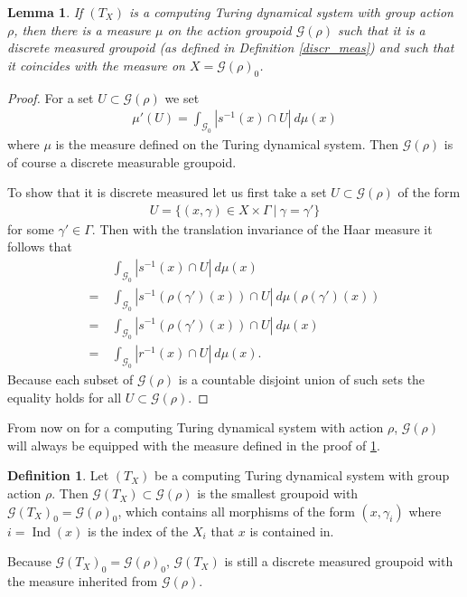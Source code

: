 \documentclass[12pt,a4paper]{scrartcl}
\theoremstyle{plain}
\newtheorem{Lemma}[Theorem]{Lemma}
\theoremstyle{definition}
\newtheorem{Definition}[Theorem]{Definition}
\newcommand{\2}{\mathbb{Z} / 2 \mathbb{Z}}
\newcommand{\G}{\mathcal{G}}
\newcommand{\1}{\bar{1}}
\newcommand{\0}{\bar{0}}
\newcommand{\Ind}{\operatorname{Ind}}
\begin{document}
\begin{Lemma}\label{act_group_discrete_meas}
	If $(T_X)$ is a computing Turing dynamical system with group action $\rho$, then there is a measure $\mu$ on the action groupoid $\G(\rho)$ such that it is a discrete measured groupoid (as defined in Definition \ref{discr_meas}) and such that it coincides with the measure on $X = \G(\rho)_0$.
\end{Lemma}
\begin{proof} 
	For a set $U \subset \G(\rho)$ we set
	\begin{align*}
		\mu' (U) = \int_{\mathcal{G}_0} |s^{-1}(x) \cap U| ~d\mu(x)
	\end{align*}
	where $\mu$ is the measure defined on the Turing dynamical system. Then $\G(\rho)$ is of course a discrete measurable groupoid.
	
	To show that it is discrete measured let us first take a set $U \subset \G(\rho)$ of the form
	\begin{align*}
		U = \{(x, \gamma) \in X \times \Gamma ~|~ \gamma = \gamma'\}
	\end{align*}
	for some $\gamma' \in \Gamma$. Then with the translation invariance of the Haar measure it follows that
	\begin{align*}
		 &~ \int_{\mathcal{G}_0} |s^{-1}(x) \cap U| ~d\mu(x) \\
		=&~ \int_{\mathcal{G}_0} |s^{-1}(\rho(\gamma')(x)) \cap U| ~d\mu(\rho(\gamma')(x)) \\
		=&~ \int_{\mathcal{G}_0} |s^{-1}(\rho(\gamma')(x)) \cap U| ~d\mu(x) \\
		=&~ \int_{\mathcal{G}_0} |r^{-1}(x) \cap U| ~d\mu(x).
	\end{align*}
	Because each subset of $\G(\rho)$ is a countable disjoint union of such sets the equality holds for all $U \subset \G(\rho)$.
\end{proof}
From now on for a computing Turing dynamical system with action $\rho$, $\G(\rho)$ will always be equipped with the measure defined in the proof of \ref{act_group_discrete_meas}.
\begin{Definition}
	Let $(T_X)$ be a computing Turing dynamical system with group action $\rho$. Then $\G (T_X) \subset \G(\rho)$ is the smallest groupoid with $\G (T_X)_0 = \G(\rho)_0$, which contains all morphisms of the form $(x, \gamma_i)$ where $i = \Ind(x)$ is the index of the $X_i$ that $x$ is contained in.
\end{Definition}
Because $\G (T_X)_0 = \G(\rho)_0$, $\G (T_X)$ is still a discrete measured groupoid with the measure inherited from $\G(\rho)$.
\end{document}
